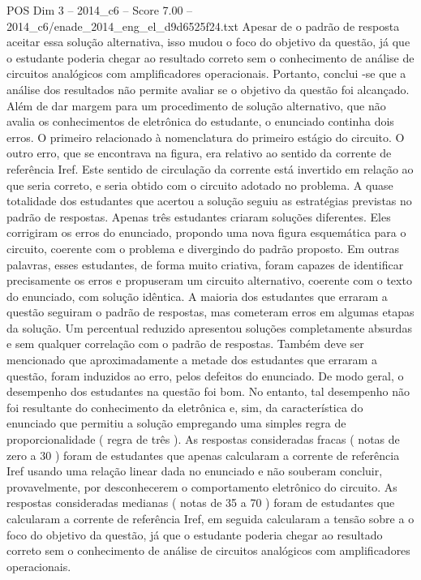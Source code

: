 \begin{textsample}{POS Dim 3 – 2014\_c6 – Score 7.00 – 2014\_c6/enade\_2014\_eng\_el\_d9d6525f24.txt}
Apesar de o padrão de resposta aceitar essa solução alternativa, isso mudou o foco do objetivo da questão, já que o estudante poderia chegar ao resultado correto sem o conhecimento de análise de circuitos analógicos com amplificadores operacionais.
Portanto, conclui -se que a análise dos resultados não permite avaliar se o objetivo da questão foi alcançado.
Além de dar margem para um procedimento de solução alternativo, que não avalia os conhecimentos de eletrônica do estudante, o enunciado continha dois erros.
O primeiro relacionado à nomenclatura do primeiro estágio do circuito.
O outro erro, que se encontrava na figura, era relativo ao sentido da corrente de referência Iref.
Este sentido de circulação da corrente está invertido em relação ao que seria correto, e seria obtido com o circuito adotado no problema.
A quase totalidade dos estudantes que acertou a solução seguiu as estratégias previstas no padrão de respostas.
Apenas três estudantes criaram soluções diferentes.
Eles corrigiram os erros do enunciado, propondo uma nova figura esquemática para o circuito, coerente com o problema e divergindo do padrão proposto.
Em outras palavras, esses estudantes, de forma muito criativa, foram capazes de identificar precisamente os erros e propuseram um circuito alternativo, coerente com o texto do enunciado, com solução idêntica.
A maioria dos estudantes que erraram a questão seguiram o padrão de respostas, mas cometeram erros em algumas etapas da solução.
Um percentual reduzido apresentou soluções completamente absurdas e sem qualquer correlação com o padrão de respostas.
Também deve ser mencionado que aproximadamente a metade dos estudantes que erraram a questão, foram induzidos ao erro, pelos defeitos do enunciado.
De modo geral, o desempenho dos estudantes na questão foi bom.
No entanto, tal desempenho não foi resultante do conhecimento da eletrônica e, sim, da característica do enunciado que permitiu a solução empregando uma simples regra de proporcionalidade ( regra de três ).
As respostas consideradas fracas ( notas de zero a 30 ) foram de estudantes que apenas calcularam a corrente de referência Iref usando uma relação linear dada no enunciado e não souberam concluir, provavelmente, por desconhecerem o comportamento eletrônico do circuito.
As respostas consideradas medianas ( notas de 35 a 70 ) foram de estudantes que calcularam a corrente de referência Iref, em seguida calcularam a tensão sobre a o foco do objetivo da questão, já que o estudante poderia chegar ao resultado correto sem o conhecimento de análise de circuitos analógicos com amplificadores operacionais.

\end{textsample}
